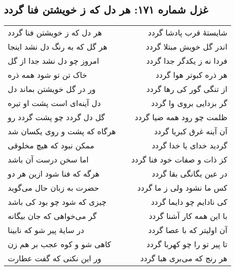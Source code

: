 \begin{center}
\section*{غزل شماره ۱۷۱: هر دل که ز خویشتن فنا گردد}
\label{sec:171}
\begin{longtable}{l p{0.5cm} r}
هر دل که ز خویشتن فنا گردد
&&
شایستهٔ قرب پادشا گردد
\\
هر گل که به رنگ دل نشد اینجا
&&
اندر گل خویش مبتلا گردد
\\
امروز چو دل نشد جدا از گل
&&
فردا نه ز یکدگر جدا گردد
\\
خاک تن تو شود همه ذره
&&
هر ذره کبوتر هوا گردد
\\
ور در گل خویشتن بماند دل
&&
از تنگی گور کی رها گردد
\\
دل آینه‌ای است پشت او تیره
&&
گر بزدایی بروی وا گردد
\\
گل دل گردد چو پشت گردد رو
&&
ظلمت چو رود همه ضیا گردد
\\
هرگاه که پشت و روی یکسان شد
&&
آن آینه غرق کبریا گردد
\\
ممکن نبود که هیچ مخلوقی
&&
گردید خدای یا خدا گردد
\\
اما سخن درست آن باشد
&&
کز ذات و صفات خود فنا گردد
\\
هرگه که فنا شود ازین هر دو
&&
در عین یگانگی بقا گردد
\\
حضرت به زبان حال می‌گوید
&&
کس ما نشود ولی ز ما گردد
\\
چیزی که شود چو بود کی باشد
&&
کی نادایم چو دایما گردد
\\
گر می‌خواهی که جان بیگانه
&&
با این همه کار آشنا گردد
\\
در سایهٔ پیر شو که نابینا
&&
آن اولیتر که با عصا گردد
\\
کاهی شو و کوه عجب بر هم زن
&&
تا پیر تو را چو کهربا گردد
\\
ور این نکنی که گفت عطارت
&&
هر رنج که می‌بری هبا گردد
\\
\end{longtable}
\end{center}
